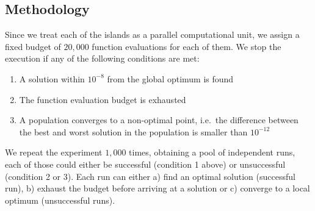 \documentclass{sig-alternate}
\begin{document}

\subsection{Methodology}

Since we treat each of the islands as a parallel computational unit, we assign a fixed budget of $20,000$ function evaluations for each of them.
We stop the execution if any of the following conditions are met:
\begin{enumerate}
    \item A solution within $10^{-8}$ from the global optimum is found
    \item The function evaluation budget is exhausted
    \item A population converges to a non-optimal point, i.e.\ the difference between the best and worst solution in the population is smaller than $10^{-12}$
\end{enumerate}

We repeat the experiment $1,000$ times, obtaining a pool of independent runs, each of those could either be successful (condition 1 above) or unsuccessful (condition 2 or 3).
Each run can either a) find an optimal solution (successful run), b) exhaust the budget before arriving at a solution or c) converge to a local optimum (unsuccessful runs).
\end{document}
